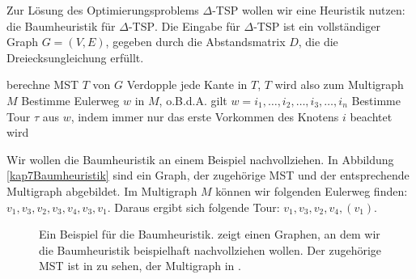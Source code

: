 Zur Lösung des Optimierungsproblems \textsc{$\varDelta$-TSP} wollen wir eine Heuristik nutzen: die Baumheuristik für \textsc{$\varDelta$-TSP}. Die Eingabe für \textsc{$\varDelta$-TSP} ist ein vollständiger Graph $G=(V,E)$, gegeben durch die Abstandsmatrix $D$, die die Dreiecksungleichung erfüllt.

\begin{Alg}
  \begin{algorithmic}[1]
    \State berechne MST $T$ von $G$
    \State Verdopple jede Kante in $T$, $T$ wird also zum Multigraph $M$
    \State Bestimme Eulerweg $w$ in $M$, o.B.d.A. gilt $w = i_1, \ldots, i_2, \ldots, i_3, \ldots, i_n$
    \State Bestimme Tour $\tau$ aus $w$, indem immer nur das erste Vorkommen des Knotens $i$ beachtet wird
  \end{algorithmic}
\end{Alg}

\begin{Bsp}
  \hspace{\parindent}Wir wollen die Baumheuristik an einem Beispiel nachvollziehen. In Abbildung \vref{kap7Baumheuristik} sind ein Graph, der zugehörige MST und der entsprechende Multigraph abgebildet. Im Multigraph $M$ können wir folgenden Eulerweg finden: $v_1, v_3, v_2, v_3, v_4, v_3, v_1$. Daraus ergibt sich folgende Tour: $v_1, v_3, v_2, v_4, (v_1)$.
  
  \begin{figure}[htb]
    \centering
    \hspace{.05\textwidth}
    \hspace{.05\textwidth}
    \caption{Ein Beispiel für die Baumheuristik.  zeigt einen Graphen, an dem wir die Baumheuristik beispielhaft nachvollziehen wollen. Der zugehörige MST ist in  zu sehen, der Multigraph in .}
    \label{kap7Baumheuristik}
  \end{figure}
\end{Bsp}

